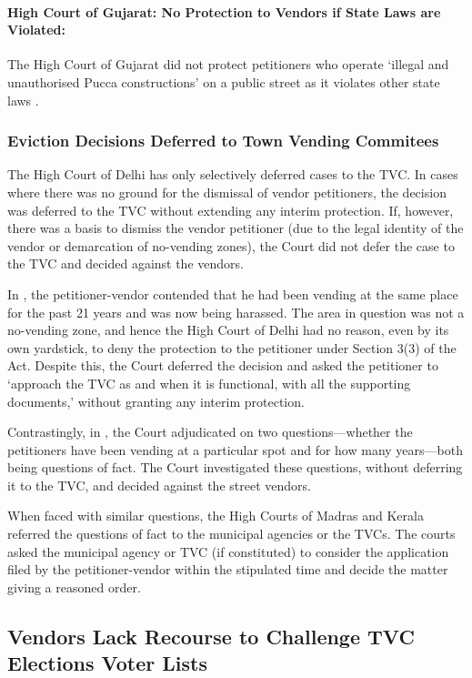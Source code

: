 \documentclass[a4paper, 12pt, twoside, table]{article}
\begin{document}
{\paragraph*{High Court of Gujarat: No Protection to Vendors if State Laws are Violated:}

The High Court of Gujarat did not protect petitioners who operate `illegal and unauthorised Pucca constructions' on a public street as it violates other state laws \parencite{VakatarSG}.

\subsubsection*{Eviction Decisions Deferred to Town Vending Commitees}

The High Court of Delhi has only selectively deferred cases to the TVC. In cases where there was no ground for the dismissal of vendor petitioners, the decision was deferred to the TVC without extending any interim protection. If, however, there was a basis to dismiss the vendor petitioner (due to the legal identity of the vendor or demarcation of no-vending zones), the Court did not defer the case to the TVC and decided against the vendors. 

In \cite{VKSahu}, the petitioner-vendor contended that he had been vending at the same place for the past 21 years and was now being harassed. The area in question was not a no-vending zone, and hence the High Court of Delhi had no reason, even by its own yardstick, to deny the protection to the petitioner under Section 3(3) of the Act. Despite this, the Court deferred the decision and asked the petitioner to `approach the TVC as and when it is functional, with all the supporting documents,' without granting any interim protection.

Contrastingly, in \cite{DwarkaS6}, the Court adjudicated on two questions—whether the petitioners have been vending at a particular spot and for how many years—both being questions of fact. The Court investigated these questions, without deferring it to the TVC, and decided against the street vendors. 

When faced with similar questions, the High Courts of Madras and Kerala referred the questions of fact to the municipal agencies or the TVCs. The courts asked the municipal agency or TVC (if constituted) to consider the application filed by the petitioner-vendor within the stipulated time and decide the matter giving a reasoned order.

\subsection*{Vendors Lack Recourse to Challenge TVC Elections Voter Lists}

}
\end{document}
